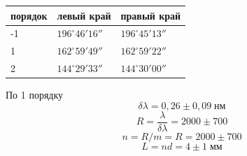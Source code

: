 \begin{figure}[ht!]
\end{figure}

\begin{tabular}{|l|l|l|}
\hline
    порядок & левый край & правый край \\\hline
    -1 & $196^{\circ} 46' 16''$ & $196^{\circ} 45' 13''$ \\\hline
    1 & $162^{\circ} 59' 49''$ & $162^{\circ} 59' 22''$ \\\hline
    2 & $144^{\circ} 29' 33''$ & $144^{\circ} 30' 00''$ \\\hline
\end{tabular}

По 1 порядку
\[
    \delta\lambda = 0{,}26 \pm 0{,}09 \;\text{нм}
\]
\[
    R = \frac{\lambda}{\delta\lambda} = 2000 \pm 700
\]
\[
    n = R / m = R = 2000 \pm 700
\]
\[
    L = nd = 4 \pm 1\;\text{мм}
\]

\newpage
